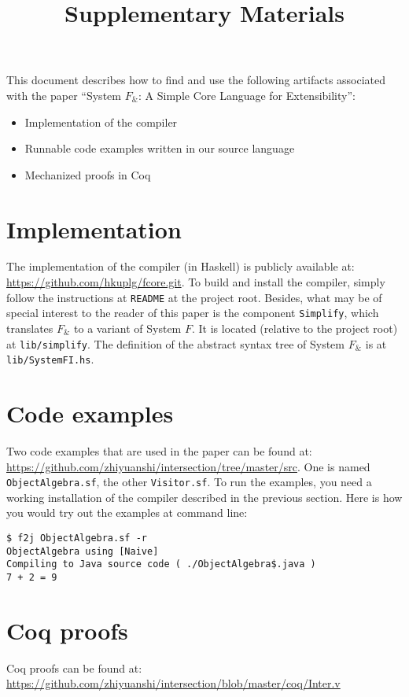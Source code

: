 \documentclass{article}
\begin{document}
\title{Supplementary Materials}
\maketitle

This document describes how to find and use the following artifacts associated
with the paper ``System $F_\&$: A Simple Core Language for Extensibility'':

\begin{itemize}
  \item Implementation of the compiler
  \item Runnable code examples written in our source language
  \item Mechanized proofs in Coq
\end{itemize}

\section*{Implementation}

The implementation of the compiler (in Haskell) is publicly available at:
\url{https://github.com/hkuplg/fcore.git}. To build and install the compiler,
simply follow the instructions at \texttt{README} at the project root. Besides,
what may be of special interest to the reader of this paper is the component
\texttt{Simplify}, which translates $ F_\&$ to a variant of System $F$. It is
located (relative to the project root) at \texttt{lib/simplify}. The definition
of the abstract syntax tree of System $F_\&$ is at \texttt{lib/SystemFI.hs}.

\section*{Code examples}

Two code examples that are used in the paper can be found at:
\url{https://github.com/zhiyuanshi/intersection/tree/master/src}. One is named
\texttt{ObjectAlgebra.sf}, the other \texttt{Visitor.sf}. To run the examples,
you need a working installation of the compiler described in the previous
section. Here is how you would try out the examples at command line:
\begin{lstlisting}
$ f2j ObjectAlgebra.sf -r
ObjectAlgebra using [Naive]
Compiling to Java source code ( ./ObjectAlgebra$.java )
7 + 2 = 9
\end{lstlisting}

\section*{Coq proofs}

Coq proofs can be found at:
\url{https://github.com/zhiyuanshi/intersection/blob/master/coq/Inter.v}
\end{document}
